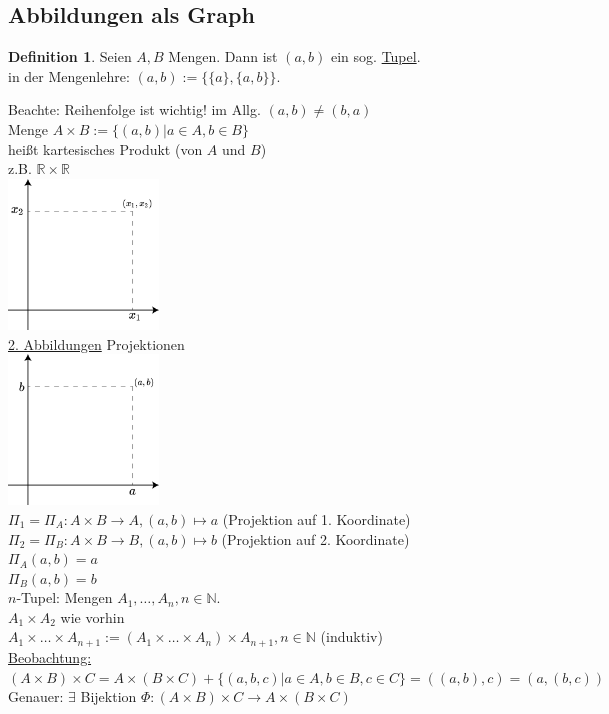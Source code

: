 \documentclass[12pt,a4paper,titlepage]{article} %
\theoremstyle{definition}
\newtheorem{defi}[satz]{Definition}
\theoremstyle{remark}
\begin{document}
\subsection{Abbildungen als Graph}
\begin{defi}
	Seien $A,B$ Mengen. Dann ist $(a,b)$ ein sog. \underline{Tupel}.\\
	in der Mengenlehre: $(a,b) := \{\{a\}, \{a,b\}\}$.
\end{defi}
Beachte: Reihenfolge ist wichtig! im Allg. $(a,b)\neq (b,a)$\\
Menge $A\times B := \{(a,b)|a\in A, b\in B\}$\\
heißt kartesisches Produkt (von $A$ und $B$)\\
z.B. $\mathbb{R}\times\mathbb{R}$\\
\includegraphics[width=0.3\textwidth]{images/img03.png}\\
\underline{2. Abbildungen} Projektionen\\
\includegraphics[width=0.3\textwidth]{images/img04.png}\\
$\Pi_1 = \Pi_A : A\times B \rightarrow A, (a,b)\mapsto a$ (Projektion auf 1. Koordinate)\\
$\Pi_2 = \Pi_B : A\times B \rightarrow B, (a,b) \mapsto b$ (Projektion auf 2. Koordinate)\\
$\Pi_A(a,b) = a$\\
$\Pi_B(a,b) = b$\\
$n$-Tupel: Mengen $A_1,\dots ,A_n, n\in \mathbb{N}.$\\
$A_1\times A_2$ wie vorhin\\
$A_1\times\dots\times A_{n+1} := (A_1\times\dots\times A_n)\times A_{n+1}, n\in \mathbb{N}$ (induktiv)\\
\underline{Beobachtung:}\\
$(A\times B)\times C = A\times (B\times C) + \{(a,b,c)|a\in A, b\in B, c\in C\} = ((a,b),c) = (a,(b,c))$\\
Genauer: $\exists$ Bijektion $\Phi : (A\times B) \times C \rightarrow A\times (B\times C)$
\end{document}

